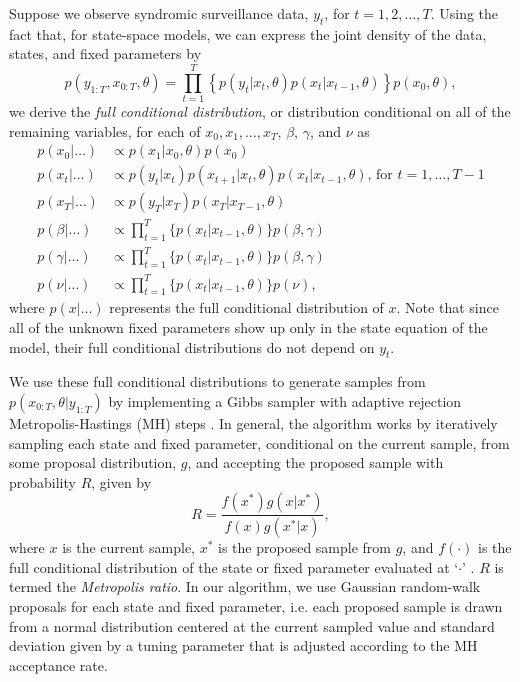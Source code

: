 Suppose we observe syndromic surveillance data, $y_t$, for $t = 1, 2, \ldots, T$. Using the fact that, for state-space models, we can express the joint density of the data, states, and fixed parameters by
\begin{equation}
p(y_{1:T},x_{0:T},\theta) = \prod_{t = 1}^T \left\{p(y_t|x_t,\theta)p(x_t|x_{t-1},\theta)\right\}p(x_0,\theta), \label{eqn:joint}
\end{equation}
we derive the \emph{full conditional distribution}, or distribution conditional on all of the remaining variables, for each of $x_0, x_1, \ldots, x_T$, $\beta$, $\gamma$, and $\nu$ as
\begin{align}
p(x_0|\hdots) &\propto p(x_1|x_0,\theta)p(x_0) \label{eqn:epid:fullcond} \\
p(x_t|\hdots) &\propto p(y_t|x_t)p(x_{t+1}|x_t,\theta)p(x_t|x_{t-1},\theta) \mbox{, for } t = 1,\ldots,T-1 \nonumber \\
p(x_T|\hdots) &\propto p(y_T|x_T)p(x_T|x_{T-1},\theta) \nonumber \\
p(\beta|\hdots) &\propto \prod_{t=1}^T \{p(x_t|x_{t-1},\theta)\}p(\beta, \gamma) \nonumber \\
p(\gamma|\hdots) &\propto \prod_{t=1}^T \{p(x_t|x_{t-1},\theta)\}p(\beta, \gamma) \nonumber \\
p(\nu|\hdots) &\propto \prod_{t=1}^T \{p(x_t|x_{t-1},\theta)\}p(\nu), \nonumber
\end{align}
where $p(x|\hdots)$ represents the full conditional distribution of $x$. Note that since all of the unknown fixed parameters show up only in the state equation of the model, their full conditional distributions do not depend on $y_t$.

We use these full conditional distributions to generate samples from $p(x_{0:T},\theta|y_{1:T})$ by implementing a Gibbs sampler with adaptive rejection Metropolis-Hastings (MH) steps \citep{Metr:Rose:Rose:Tell:Tell:equa:1953, Hast:mont:1970,  Gema:Gema:stoc:1984, gilks1995adaptive}. In general, the algorithm works by iteratively sampling each state and fixed parameter, conditional on the current sample, from some proposal distribution, $g$, and accepting the proposed sample with probability $R$, given by
\begin{equation}
R = \frac{f(x^*)g(x|x^*)}{f(x)g(x^*|x)}, \label{eqn:mhrat}
\end{equation}
where $x$ is the current sample, $x^*$ is the proposed sample from $g$, and $f(\cdot)$ is the full conditional distribution of the state or fixed parameter evaluated at `$\cdot$' \cite[Chapter 7][]{giv:hoet:2005:comp}. $R$ is termed the \emph{Metropolis ratio}. In our algorithm, we use Gaussian random-walk proposals for each state and fixed parameter, i.e. each proposed sample is drawn from a normal distribution centered at the current sampled value and standard deviation given by a tuning parameter that is adjusted according to the MH acceptance rate.

